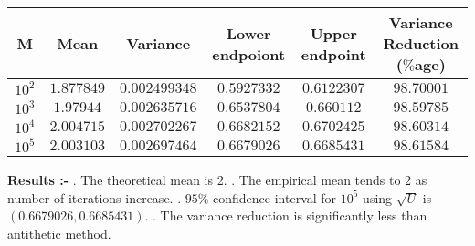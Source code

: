 \documentclass[12pt]{book}
\begin{document}
\begin{center}
 \begin{tabular}{||c c c c c c||} 
 \hline
 M & Mean & Variance & Lower endpoiont & Upper endpoint & Variance Reduction ($\%$age)\\ [0.5ex] 
 \hline\hline
 $10^2$ & $1.877849$ & $0.002499348$ & $0.5927332$ & $0.6122307$ & $98.70001$\\ 
 \hline
 $10^3$ & $1.97944$ & $0.002635716$ & $0.6537804$ & $0.660112$ & $98.59785$\\
 \hline
 $10^4$ & $2.004715$ & $0.002702267$ & $0.6682152$ & $0.6702425$ & $98.60314$\\
 \hline
 $10^5$ & $2.003103$ & $0.002697464$ & $0.6679026$ & $0.6685431$ & $98.61584$\\  [1ex] 
 \hline
\end{tabular}
\end{center}
\textbf{\large Results :-} . The theoretical mean is 2. . The empirical mean tends to 2 as number of iterations increase. . $95\%$ confidence interval for $10^5$ using $\sqrt{U}$ is $( 0.6679026,0.6685431 )$. . The variance reduction is significantly less than antithetic method. \newline

\newpage
\end{document}
